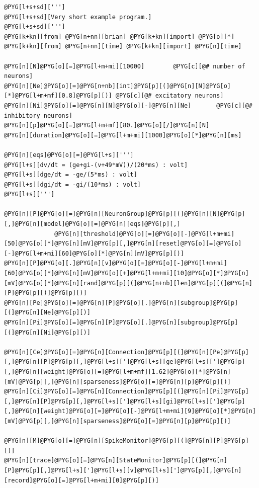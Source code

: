 \documentclass[letterpaper,10pt,english]{manual}
\begin{document}
\begin{Verbatim}[commandchars=@\[\]]
@PYG[l+s+sd][''']
@PYG[l+s+sd][Very short example program.]
@PYG[l+s+sd][''']
@PYG[k+kn][from] @PYG[n+nn][brian] @PYG[k+kn][import] @PYG[o][*]
@PYG[k+kn][from] @PYG[n+nn][time] @PYG[k+kn][import] @PYG[n][time]

@PYG[n][N]@PYG[o][=]@PYG[l+m+mi][10000]        @PYG[c][@# number of neurons]
@PYG[n][Ne]@PYG[o][=]@PYG[n+nb][int]@PYG[p][(]@PYG[n][N]@PYG[o][*]@PYG[l+m+mf][0.8]@PYG[p][)] @PYG[c][@# excitatory neurons]
@PYG[n][Ni]@PYG[o][=]@PYG[n][N]@PYG[o][-]@PYG[n][Ne]       @PYG[c][@# inhibitory neurons]
@PYG[n][p]@PYG[o][=]@PYG[l+m+mf][80.]@PYG[o][/]@PYG[n][N]
@PYG[n][duration]@PYG[o][=]@PYG[l+m+mi][1000]@PYG[o][*]@PYG[n][ms]

@PYG[n][eqs]@PYG[o][=]@PYG[l+s][''']
@PYG[l+s][dv/dt = (ge+gi-(v+49*mV))/(20*ms) : volt]
@PYG[l+s][dge/dt = -ge/(5*ms) : volt]
@PYG[l+s][dgi/dt = -gi/(10*ms) : volt]
@PYG[l+s][''']

@PYG[n][P]@PYG[o][=]@PYG[n][NeuronGroup]@PYG[p][(]@PYG[n][N]@PYG[p][,]@PYG[n][model]@PYG[o][=]@PYG[n][eqs]@PYG[p][,]
              @PYG[n][threshold]@PYG[o][=]@PYG[o][-]@PYG[l+m+mi][50]@PYG[o][*]@PYG[n][mV]@PYG[p][,]@PYG[n][reset]@PYG[o][=]@PYG[o][-]@PYG[l+m+mi][60]@PYG[o][*]@PYG[n][mV]@PYG[p][)]
@PYG[n][P]@PYG[o][.]@PYG[n][v]@PYG[o][=]@PYG[o][-]@PYG[l+m+mi][60]@PYG[o][*]@PYG[n][mV]@PYG[o][+]@PYG[l+m+mi][10]@PYG[o][*]@PYG[n][mV]@PYG[o][*]@PYG[n][rand]@PYG[p][(]@PYG[n+nb][len]@PYG[p][(]@PYG[n][P]@PYG[p][)]@PYG[p][)]
@PYG[n][Pe]@PYG[o][=]@PYG[n][P]@PYG[o][.]@PYG[n][subgroup]@PYG[p][(]@PYG[n][Ne]@PYG[p][)]
@PYG[n][Pi]@PYG[o][=]@PYG[n][P]@PYG[o][.]@PYG[n][subgroup]@PYG[p][(]@PYG[n][Ni]@PYG[p][)]

@PYG[n][Ce]@PYG[o][=]@PYG[n][Connection]@PYG[p][(]@PYG[n][Pe]@PYG[p][,]@PYG[n][P]@PYG[p][,]@PYG[l+s][']@PYG[l+s][ge]@PYG[l+s][']@PYG[p][,]@PYG[n][weight]@PYG[o][=]@PYG[l+m+mf][1.62]@PYG[o][*]@PYG[n][mV]@PYG[p][,]@PYG[n][sparseness]@PYG[o][=]@PYG[n][p]@PYG[p][)]
@PYG[n][Ci]@PYG[o][=]@PYG[n][Connection]@PYG[p][(]@PYG[n][Pi]@PYG[p][,]@PYG[n][P]@PYG[p][,]@PYG[l+s][']@PYG[l+s][gi]@PYG[l+s][']@PYG[p][,]@PYG[n][weight]@PYG[o][=]@PYG[o][-]@PYG[l+m+mi][9]@PYG[o][*]@PYG[n][mV]@PYG[p][,]@PYG[n][sparseness]@PYG[o][=]@PYG[n][p]@PYG[p][)]

@PYG[n][M]@PYG[o][=]@PYG[n][SpikeMonitor]@PYG[p][(]@PYG[n][P]@PYG[p][)]
@PYG[n][trace]@PYG[o][=]@PYG[n][StateMonitor]@PYG[p][(]@PYG[n][P]@PYG[p][,]@PYG[l+s][']@PYG[l+s][v]@PYG[l+s][']@PYG[p][,]@PYG[n][record]@PYG[o][=]@PYG[l+m+mi][0]@PYG[p][)]


\end{Verbatim}
\end{document}
